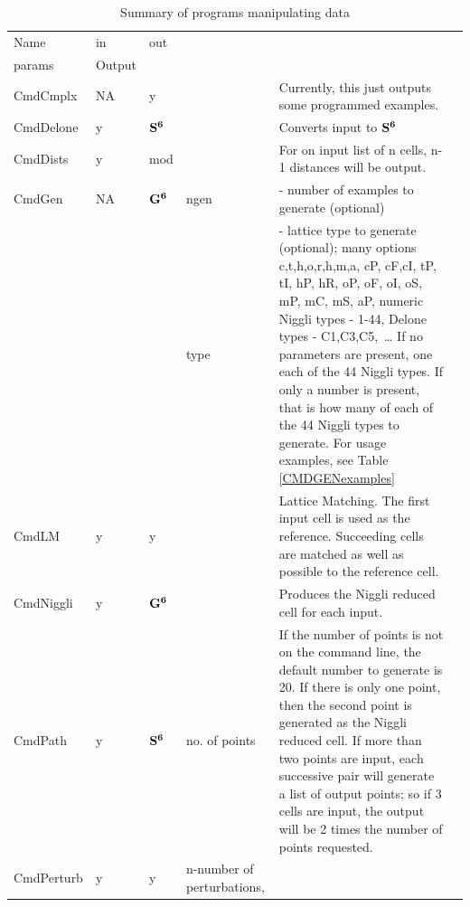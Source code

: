 \documentclass[preprint]{iucr}              %
\numberwithin{equation}{section}
\newcommand{\SVI}[0]{$\bf{S^{6}}$}
\newcommand{\GVI}[0]{$\bf{G^{6}}$}
\begin{document}
		\begin{longtable}{l l l p{} p{} l}
			\caption{Summary of programs manipulating data}
			\label{processingprogs}\\ %
			\toprule
			Name		&	in	&	out		&	\begin{parbox}[t]{2cm}{
				command line\\
				param{s}}
			\end{parbox}	& Output	\\[.9pt]
			\midrule
			CmdCmplx	&	NA	&	y		&\hrulefill	&Currently, 
				this just outputs some programmed examples.		\\[.9pt]
			CmdDelone	&	y	&	\SVI{}	&\hrulefill	&Converts input to \SVI{}		\\[.9pt]
			CmdDists	&	y	& mod		&\hrulefill	&For on input list of n
			cells, n-1 distances will be output.\\[.9pt]
			CmdGen		&	NA	&	\GVI{}	&	ngen	&- number of examples to generate (optional)\\
				{}		&		&			&type		& - lattice type to 
				generate (optional); many options 
				c,t,h,o,r,h,m,a, 
				cP, cF,cI, tP, tI, hP, hR, oP, oF, oI, oS, mP, mC, mS, aP, 
				numeric Niggli types - 1-44, 
				Delone types - C1,C3,C5,~\dots 
				If no parameters are present, one each of the 44 Niggli types. 
				If only a number is present, that is how many of each of the 44 Niggli types to generate.
				For usage examples, see Table \ref{CMDGENexamples}\\[.9pt]
			CmdLM		&	y	&	y		&	\hrulefill		&		Lattice Matching. 
				The first input cell is used as the reference. 
				Succeeding cells are matched 
				as well as possible to the reference cell.\\[.9pt]
			CmdNiggli	&	y	&	\GVI{}	&\hrulefill	&		
				Produces the Niggli reduced cell for 	each input.\\[.9pt]
			CmdPath		&	y	& \SVI{}			&
			no. of points	& If the number of points is 
			not on the command line, the default number 
			to generate is 20.	If there is only one point, 
			then the second point is generated as the 
			Niggli reduced cell. If more than two points are input, 
			each successive pair will
			generate a list of output points; so if
			3 cells are input, the output will be 
			2 times the number of points requested.	\\[.9pt]
			CmdPerturb	&	y	& y			&	n-number of perturbations, 
			

\end{longtable}
\end{document}
